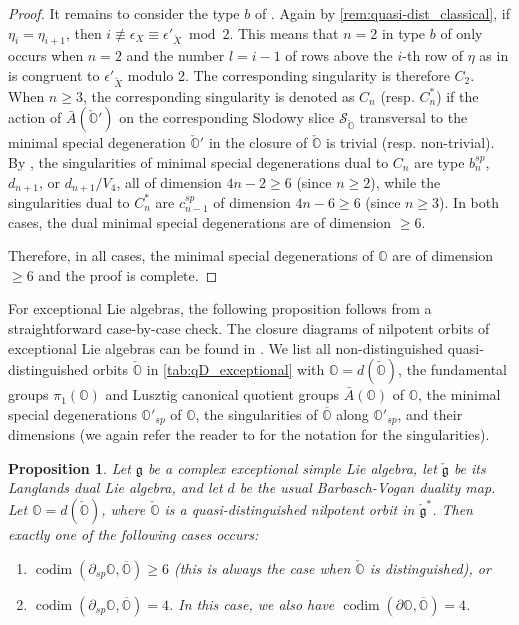 \documentclass[11pt, a4paper]{amsart}
\newcommand{\orb}{\mathbb{O}}
\newcommand{\fg}{\mathfrak{g}}
\newcommand{\ckfg}{{\check{\fg}}}
\newcommand{\ckorb}{\check{\orb}}
\newcommand{\cS}{\mathcal{S}}
\newcommand{\Abar}{\bar{A}}
\DeclareMathOperator{\codim}{codim}
\newtheorem{Prop}[Thm]{Proposition}
\theoremstyle{definition}
\numberwithin{equation}{section}
\begin{document}
\begin{proof}
It remains to consider the type $b$ of \cite[Table 1]{JLS:Duality}. Again by \cref{rem:quasi-dist_classical}, if $\eta_i = \eta_{i+1}$, then $i \not\equiv \epsilon_X \equiv \epsilon'_{\check{X}} \bmod 2$. This means that $n=2$ in type $b$ of \cite[Table 1]{JLS:Duality} only occurs when $n = 2$ and the number $l = i-1$ of rows above the $i$-th row of $\eta$ as in \cite[Table 1]{JLS:Duality} is congruent to $\epsilon'_{\check{X}}$ modulo 2. The corresponding singularity is therefore $C_2$. When $n \geqslant 3$, the corresponding singularity is denoted as $C_n$ (resp. $C_n^*$) if the action of $\Abar(\ckorb')$ on the corresponding Slodowy slice $\cS_{\ckorb}$ transversal to the minimal special degeneration $\ckorb'$ in the closure of $\ckorb$ is trivial (resp. non-trivial). By \cite[Figure 2]{JLS:Duality}, the singularities of minimal special degenerations dual to $C_n$ are type $b_{n}^{sp}$, $d_{n+1}$, or $d_{n+1}/V_4$, all of dimension $4n-2 \geqslant 6$ (since $n \geqslant 2$), while the singularities dual to $C_n^*$ are $c_{n-1}^{sp}$ of dimension $4n-6 \geqslant 6$ (since $n \geqslant 3$). In both cases, the dual minimal special degenerations are of dimension $\geqslant 6$.

Therefore, in all cases, the minimal special degenerations of $\orb$ are of dimension $\geqslant 6$ and the proof is complete.
\end{proof}

For exceptional Lie algebras, the following proposition follows from a straightforward case-by-case check. The closure diagrams of nilpotent orbits of exceptional Lie algebras can be found in \cite{FJLS:generic_sing}. We list all non-distinguished quasi-distinguished orbits $\ckorb$ in \cref{tab:qD_exceptional} with $\orb = d(\ckorb)$, the fundamental groups $\pi_1(\orb)$ and Lusztig canonical quotient groups $\Abar(\orb)$ of $\orb$, the minimal special degenerations $\orb'_{sp}$ of $\orb$, the singularities of $\overline{\orb}$ along $\orb'_{sp}$, and their dimensions (we again refer the reader to \cite{JLS:Duality} for the notation for the singularities).

\begin{Prop} \label{prop:codim_sp_exceptional}
	Let $\fg$ be a complex exceptional simple Lie algebra, let $\ckfg$ be its Langlands dual Lie algebra, and let $d$ be the usual Barbasch-Vogan duality map. Let $\orb = d(\ckorb)$, where $\ckorb$ is a quasi-distinguished nilpotent orbit in $\ckfg^*$. Then exactly one of the following cases occurs:
	\begin{enumerate}
		\item \label{item:exc_codim_6}
			$\codim(\partial_{sp} \orb, \overline{\orb}) \geqslant 6$ (this is always the case when $\ckorb$ is distinguished), or
		\item \label{item:exc_codim_4}
			$\codim(\partial_{sp} \orb, \overline{\orb}) = 4$. In this case, we also have $\codim(\partial \orb, \overline{\orb}) = 4$.
	\end{enumerate}
\end{Prop}
\end{document}
